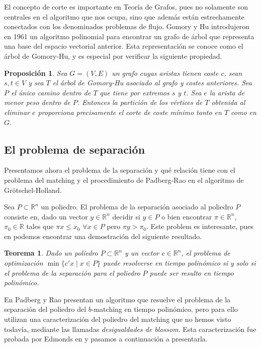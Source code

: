 \documentclass[twoside,a4paper,openright,12pt,tikz]{book}
\newtheorem{prop}{Proposici\'on}[section]
\newtheorem{thm}{Teorema}[section]
\newcommand{\R}{\mathbb{R}}
\begin{document}
El concepto de corte es importante en Teoría de Grafos, pues no solamente son centrales en el algoritmo que nos ocupa, sino que además están estrechamente conectados con los denominados problemas de flujo.  Gomory y Hu introdujeron en 1961 un algoritmo polinomial para encontrar un grafo de árbol que representa una base del espacio vectorial anterior. Esta representación se conoce como el árbol de Gomory-Hu, y es especial por verificar la siguiente propiedad.

\begin{prop}
Sea $G=(V,E)$ un grafo cuyas aristas tienen coste $c$, sean $s,t\in V$ y sea $T$ el árbol de Gomory-Hu asociado al grafo y costes anteriores. Sea $P$ el único camino dentro de $T$ que tiene por extremos $s$ y $t$. Sea $e$ la arista de menor peso dentro de $P$. Entonces la partición de los vértices de $T$ obtenida al eliminar $e$ proporciona precisamente el corte de coste mínimo tanto en $T$ como en $G$.
\end{prop}
\subsection{El problema de separación}

Presentamos ahora el problema de la separación y qué relación tiene con el problema del matching y el procedimiento de Padberg-Rao en el algoritmo de Grötschel-Holland. 

Sea $P\subset \R^n$ un poliedro. El problema de la separación asociado al poliedro $P$ consiste en, dado un vector $y\in \R^n$ decidir si $y\in P$ o bien encontrar $\pi \in \R^n$, $\pi_0\in\R$ tales que $\pi x \leq x_0$ $\forall x \in P$ pero $\pi y > \pi_0$. Este problem es interesante, pues en \cite{sepa} podemos encontrar una demostración del siguiente resultado.
\begin{thm}
Dado un poliedro $P\subset \R^n$ y un vector $c\in \R^n$, el problema de optimización $\min\{c'x \mid x \in P\}$ puede resolverse en tiempo polinómico si y solo si el problema de la separación para el poliedro $P$ puede ser resulto en tiempo polinómico.
\end{thm}
En \cite{rao} Padberg y Rao presentan un algoritmo que resuelve el problema de la separación del poliedro del $b$-matching en tiempo polinómico, pero para ello utilizan una caracterización del poliedro del matching que no hemos visto todavía, mediante las llamadas \textit{desigualdades de blossom}. Esta caracterización fue probada por Edmonds en \cite{edmond} y pasamos a continuación a presentarla.
\end{document}

